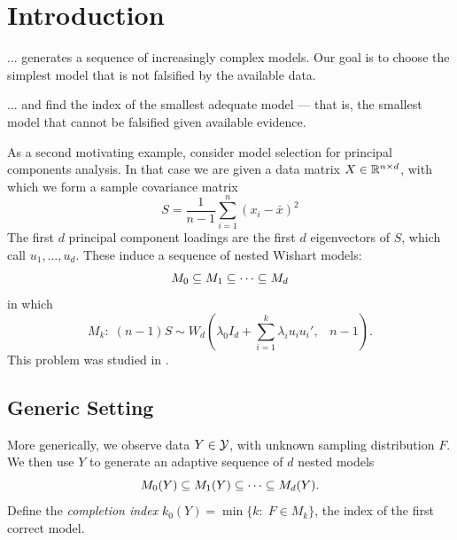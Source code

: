 \documentclass{article}
\begin{document}
\section{Introduction}

... generates a sequence of increasingly complex models. Our goal is to choose the simplest model that is not falsified by the available data.

... and find the index of the smallest adequate model --- that is, the smallest model that cannot be falsified given available evidence.

\begin{example}
  \citet{taylor2014exact}
\end{example}

\begin{example}
  \citet{taylor2014exact}
\end{example}

\begin{example}
  \citet{taylor2014exact}
\end{example}

\begin{example}
  As a second motivating example, consider model selection for   principal components analysis. In that case we are given a data matrix $X \in \mathbb{R}^{n\times d}$, with which we form a sample covariance matrix
\[
S = \frac{1}{n-1} \sum_{i=1}^n(x_i - \bar x)^2
\]
The first $d$ principal component loadings are the first $d$ eigenvectors of $S$, which call $u_1,\ldots, u_d$. These induce a sequence of nested Wishart models:
\[
M_0 \subseteq M_1 \subseteq \cdots \subseteq M_d
\]
in which
\begin{equation}
  M_k:\; (n-1) S \sim W_d\left(\lambda_0 I_d + \sum_{i=1}^k     \lambda_i u_i u_i', \;\;\; n-1\right).
\end{equation}
This problem was studied in \citet{choi2014selecting}.
\end{example}

\subsection{Generic Setting}

More generically, we observe data $Y \in \mathcal{Y}$, with unknown sampling distribution $F$. We then use $Y$ to generate an adaptive sequence of $d$ nested models
\[
M_0(Y) \subseteq M_1(Y) \subseteq \cdots \subseteq M_d(Y).
\]
Define the {\em completion index} $k_0(Y) = \min\{k:\; F \in M_k\}$, the index of the first correct model. 
\end{document}
